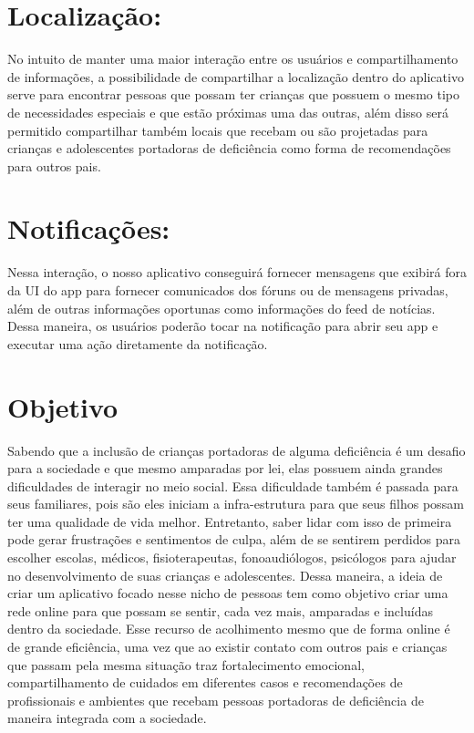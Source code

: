 \begin{apendicesenv}
\section{Localização: }
No intuito de manter uma maior interação entre os usuários e compartilhamento de informações, a possibilidade de compartilhar a localização dentro do aplicativo serve para encontrar pessoas que possam ter crianças que possuem o mesmo tipo de  necessidades especiais e que estão próximas uma das outras, além disso será permitido compartilhar também locais que recebam ou são projetadas para crianças e adolescentes portadoras de deficiência como forma de recomendações para outros pais. 

\section{Notificações: }
Nessa interação, o nosso aplicativo conseguirá fornecer mensagens que exibirá fora da UI do app para fornecer comunicados dos fóruns ou de mensagens privadas, além de outras informações oportunas como informações do feed de notícias. Dessa maneira, os usuários poderão tocar na notificação para abrir seu app e executar uma ação diretamente da notificação. 



\section{Objetivo}
Sabendo que a inclusão de crianças portadoras de alguma deficiência é um desafio para a sociedade e que mesmo amparadas por lei, elas possuem ainda grandes dificuldades de interagir no meio social. Essa dificuldade também é passada para seus familiares, pois são eles iniciam a infra-estrutura para que seus filhos possam ter uma qualidade de vida melhor. Entretanto, saber lidar com isso de primeira pode gerar frustrações e sentimentos de culpa, além de se sentirem perdidos para escolher escolas, médicos, fisioterapeutas, fonoaudiólogos, psicólogos para ajudar no desenvolvimento de suas crianças e adolescentes.  Dessa maneira, a ideia de criar um aplicativo focado nesse nicho de pessoas tem como objetivo criar uma rede online para que possam se sentir, cada vez mais, amparadas e incluídas dentro da sociedade. Esse recurso de acolhimento mesmo que de forma online é de grande eficiência, uma vez que ao existir contato com outros pais e crianças que passam pela mesma situação traz fortalecimento emocional, compartilhamento de cuidados em diferentes casos e recomendações de profissionais e ambientes que recebam pessoas portadoras de deficiência de maneira integrada com a sociedade.




\end{apendicesenv}
